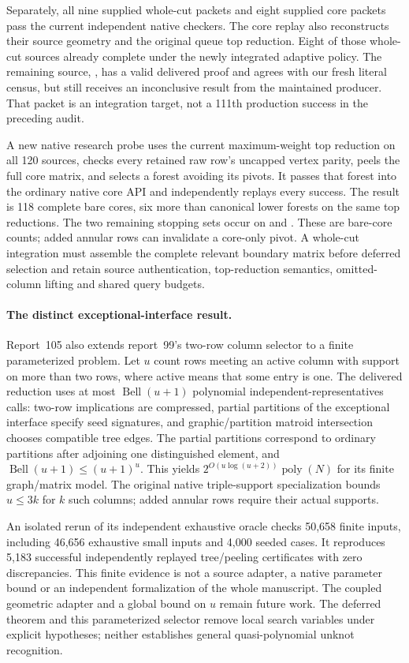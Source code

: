 Separately, all nine supplied whole-cut packets and eight supplied core
packets pass the current independent native checkers. The core replay also
reconstructs their source geometry and the original queue top reduction.
Eight of those whole-cut sources already complete under the newly
integrated adaptive policy. The remaining source,
, has a valid delivered proof and agrees with
our fresh literal census, but still receives an inconclusive result from
the maintained producer. That packet is an integration target, not a
111th production success in the preceding audit.

A new native research probe uses the current maximum-weight top reduction
on all 120 sources, checks every retained raw row's uncapped vertex parity,
peels the full core matrix, and selects a forest avoiding its pivots. It
passes that forest into the ordinary native core API and independently
replays every success. The result is 118 complete bare cores, six more than
canonical lower forests on the same top reductions. The two remaining
stopping sets occur on  and
. These are bare-core counts; added
annular rows can invalidate a core-only pivot. A whole-cut integration
must assemble the complete relevant boundary matrix before deferred
selection and retain source authentication, top-reduction semantics,
omitted-column lifting and shared query budgets.

\paragraph{The distinct exceptional-interface result.}
Report~105 also extends report~99's two-row column selector to a finite
parameterized problem. Let $u$ count rows meeting an active column with
support on more than two rows, where active means that some entry is one.
The delivered reduction uses at most $\operatorname{Bell}(u+1)$ polynomial
independent-representatives calls: two-row implications are compressed,
partial partitions of the exceptional interface specify seed signatures,
and graphic/partition matroid intersection chooses compatible tree edges.
The partial partitions correspond to ordinary partitions after adjoining
one distinguished element, and
$\operatorname{Bell}(u+1)\leq(u+1)^u$. This yields
$2^{O(u\log(u+2))}\operatorname{poly}(N)$ for its finite graph/matrix model.
The original native triple-support specialization bounds $u\leq3k$ for
$k$ such columns; added annular rows require their actual supports.

An isolated rerun of its independent exhaustive oracle checks 50,658
finite inputs, including 46,656 exhaustive small inputs and 4,000 seeded
cases. It reproduces 5,183 successful independently replayed tree/peeling
certificates with zero discrepancies. This finite evidence is not a source
adapter, a native parameter bound or an independent formalization of the
whole manuscript. The coupled geometric adapter and a global bound on
$u$ remain future work. The deferred theorem and this parameterized
selector remove local search variables under explicit hypotheses; neither
establishes general quasi-polynomial unknot recognition.

